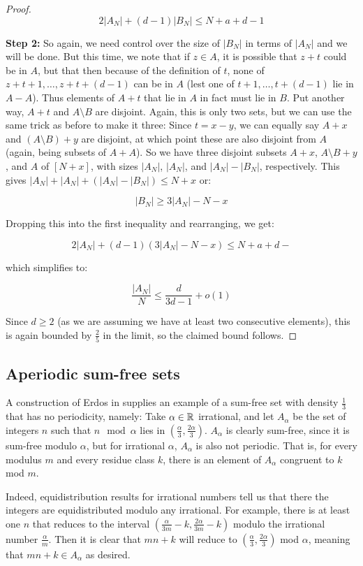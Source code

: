 \documentclass{report}
\theoremstyle{remark}
\numberwithin{equation}{section}
\begin{document}
\begin{proof}
\[2|A_N|+(d-1)|B_N| \leq N+a+d-1\]

\textbf{Step 2: }So again, we need control over the size of $|B_N|$ in
terms of $|A_N|$ and we will be done.  But this time, we note that if
$z \in A$, it is possible that $z+t$ could be in $A$, but that then
because of the definition of $t$, none of $z+t+1, \ldots, z+t+(d-1)$
can be in $A$ (lest one of $t+1, \ldots, t+(d-1)$ lie in $A-A$).  Thus
elements of $A+t$ that lie in $A$ in fact must lie in $B$.  Put another
way, $A+t$ and $A \setminus B$ are disjoint.  Again, this is only two
sets, but we can use the same trick as before to make it three: Since
$t = x-y$, we can equally say $A+x$ and $(A \setminus B) + y$ are
disjoint, at which point these are also disjoint from $A$ (again,
being subsets of $A+A$).  So we have three disjoint subsets $A+x$,
$A \setminus B + y$, and $A$ of $[N+x]$, with sizes $|A_N|$, $|A_N|$,
and $|A_N|-|B_N|$, respectively.  This gives
$|A_N| + |A_N| + (|A_N| - |B_N|) \leq N+x$ or:

\[|B_N| \geq 3|A_N|-N-x\]

Dropping this into the first inequality and rearranging, we get:

\[2|A_N|+(d-1)(3|A_N|-N-x) \leq N+a+d-\]

which simplifies to: 

\[\frac{|A_N|}{N} \leq \frac{d}{3d-1} + o(1)\]

Since $d \geq 2$ (as we are assuming we have at least two consecutive
elements), this is again bounded by $\frac25$ in the limit, so the
claimed bound follows.
\end{proof}

\subsection{Aperiodic sum-free sets}

A construction of Erdos in \cite{erdos:spm1965} supplies an
example of a sum-free set with density $\frac13$ that has no
periodicity, namely: Take $\alpha \in \mathbb{R}$ irrational, and let
$A_\alpha$ be the set of integers $n$ such that $n \mod{\alpha}$ lies
in $\left(\frac \alpha 3, \frac {2\alpha}{3}\right)$.  $A_\alpha$ is
clearly sum-free, since it is sum-free modulo $\alpha$, but for
irrational $\alpha$, $A_\alpha$ is also not periodic.  That is, for
every modulus $m$ and every residue class $k$, there is an element of
$A_\alpha$ congruent to $k$ mod $m$.  

Indeed, equidistribution results for irrational numbers tell us that
there the integers are equidistributed modulo any irrational.  For
example, there is at least one $n$ that reduces to the interval
$\left(\frac{\alpha}{3m}-k,\frac{2\alpha}{3m}-k\right)$ modulo the
irrational number $\frac{\alpha}{m}$.  Then it is clear that $mn+k$
will reduce to $\left(\frac{\alpha}{3},\frac{2\alpha}{3}\right)$ mod
$\alpha$, meaning that $mn+k \in A_\alpha$ as desired.
\end{document}
